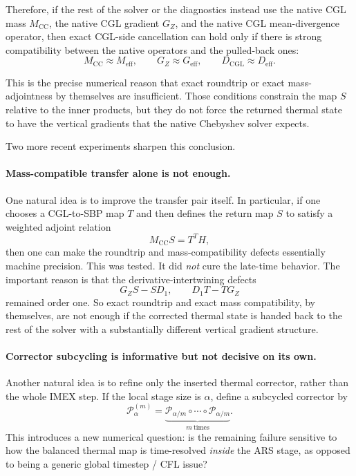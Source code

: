 \documentclass[11pt]{article}
\begin{document}
Therefore, if the rest of the solver or the diagnostics instead use the native
CGL mass $M_{\mathrm{CC}}$, the native CGL gradient $G_Z$, and the native CGL
mean-divergence operator, then exact CGL-side cancellation can hold only if
there is strong compatibility between the native operators and the pulled-back
ones:
\begin{equation}
M_{\mathrm{CC}} \approx M_{\mathrm{eff}},
\qquad
G_Z \approx G_{\mathrm{eff}},
\qquad
D_{\mathrm{CGL}} \approx D_{\mathrm{eff}}.
\label{eq:compat-summary-main}
\end{equation}

This is the precise numerical reason that exact roundtrip or exact
mass-adjointness by themselves are insufficient. Those conditions constrain the
map $S$ relative to the inner products, but they do not force the returned
thermal state to have the vertical gradients that the native Chebyshev solver
expects.

Two more recent experiments sharpen this conclusion.

\paragraph{Mass-compatible transfer alone is not enough.}
One natural idea is to improve the transfer pair itself. In particular, if one
chooses a CGL-to-SBP map $T$ and then defines the return map $S$ to satisfy a
weighted adjoint relation
\[
M_{\mathrm{CC}}S = T^T H,
\]
then one can make the roundtrip and mass-compatibility defects essentially
machine precision. This was tested. It did \emph{not} cure the late-time
behavior. The important reason is that the derivative-intertwining defects
\[
G_Z S - S D_1,
\qquad
D_1 T - T G_Z
\]
remained order one. So exact roundtrip and exact mass compatibility, by
themselves, are not enough if the corrected thermal state is handed back to the
rest of the solver with a substantially different vertical gradient structure.

\paragraph{Corrector subcycling is informative but not decisive on its own.}
Another natural idea is to refine only the inserted thermal corrector, rather
than the whole IMEX step. If the local stage size is $\alpha$, define a
subcycled corrector by
\[
\mathcal P_\alpha^{(m)}
=
\underbrace{
\mathcal P_{\alpha/m}
\circ \cdots \circ
\mathcal P_{\alpha/m}
}_{m\ \text{times}}.
\]
This introduces a new numerical question: is the remaining failure sensitive to
how the balanced thermal map is time-resolved \emph{inside} the ARS stage, as
opposed to being a generic global timestep / CFL issue?
\end{document}
